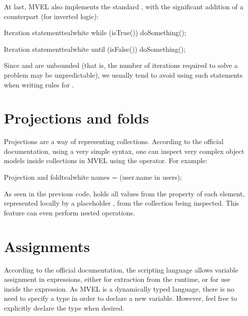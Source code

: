 At last, MVEL also implements the standard , with the significant addition of a  counterpart (for inverted logic):

\begin{codebox}{Iteration statement}{teal}{\icnote}{white}
while (isTrue()) {
   doSomething();
}
\end{codebox}

\begin{codebox}{Iteration statement}{teal}{\icnote}{white}
until (isFalse()) {
   doSomething();
}
\end{codebox}

Since  and  are unbounded (that is, the number of iterations required to solve a problem may be unpredictable), we usually tend to avoid using such statements when writing rules for \arara.

\section{Projections and folds}
\label{sec:mvelprojectionsandfolds}

Projections are a way of representing collections. According to the official documentation, using a very simple syntax, one can inspect very complex object models inside collections in MVEL using the  operator. For example:

\begin{codebox}{Projection and fold}{teal}{\icnote}{white}
names = (user.name in users);
\end{codebox}

As seen in the previous code,  holds all values from the  property of each element, represented locally by a placeholder , from the collection  being inspected. This feature can even perform nested operations.

\section{Assignments}
\label{sec:mvelassignments}

According to the official documentation, the scripting language allows variable assignment in expressions, either for extraction from the runtime, or for use inside the expression. As MVEL is a dynamically typed language, there is no need to specify a type in order to declare a new variable. However, feel free to explicitly declare the type when desired.

